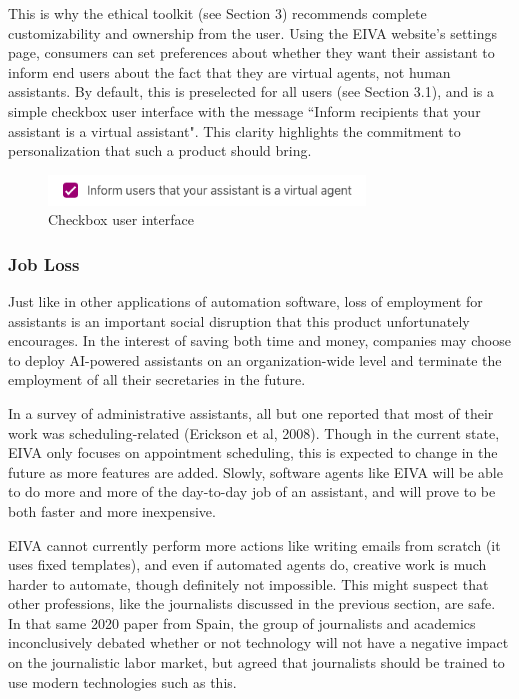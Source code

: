 \documentclass{article}
\begin{document}
This is why the ethical toolkit (see Section 3) recommends complete customizability and ownership from the user. Using the EIVA website's settings page, consumers can set preferences about whether they want their assistant to inform end users about the fact that they are virtual agents, not human assistants. By default, this is preselected for all users (see Section 3.1), and is a simple checkbox user interface with the message ``Inform recipients that your assistant is a virtual assistant". This clarity highlights the commitment to personalization that such a product should bring.

\begin{figure}[h]
 \centering
 \includegraphics[width=0.75\textwidth]{checkbox.png}
 \caption{Checkbox user interface}
 \label{fig:checkbox}
\end{figure}

\subsubsection{Job Loss}

Just like in other applications of automation software, loss of employment for assistants is an important social disruption that this product unfortunately encourages. In the interest of saving both time and money, companies may choose to deploy AI-powered assistants on an organization-wide level and terminate the employment of all their secretaries in the future.

In a survey of administrative assistants, all but one reported that most of their work was scheduling-related (Erickson et al, 2008). Though in the current state, EIVA only focuses on appointment scheduling, this is expected to change in the future as more features are added. Slowly, software agents like EIVA will be able to do more and more of the day-to-day job of an assistant, and will prove to be both faster and more inexpensive.

EIVA cannot currently perform more actions like writing emails from scratch (it uses fixed templates), and even if automated agents do, creative work is much harder to automate, though definitely not impossible. This might suspect that other professions, like the journalists discussed in the previous section, are safe. In that same 2020 paper from Spain, the group of journalists and academics inconclusively debated whether or not technology will not have a negative impact on the journalistic labor market, but agreed that journalists should be trained to use modern technologies such as this.
\end{document}
